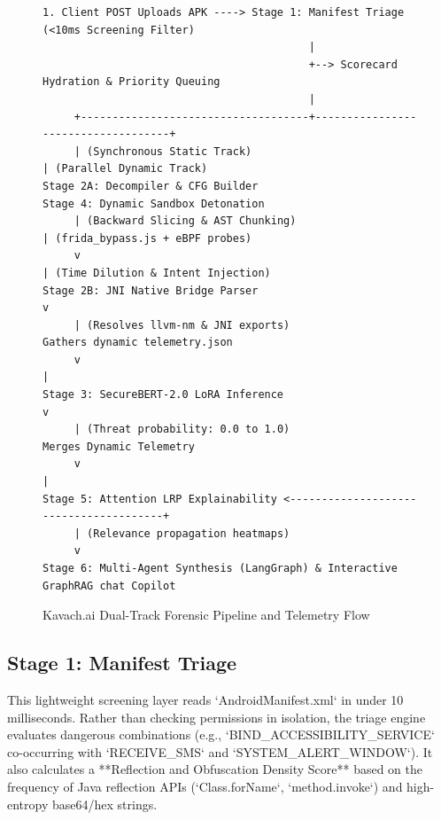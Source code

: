 \documentclass[conference]{IEEEtran}
\begin{document}
\begin{figure}[t]
\centering
\begin{minipage}{0.9\linewidth}
\begin{verbatim}
1. Client POST Uploads APK ----> Stage 1: Manifest Triage (<10ms Screening Filter)
                                          |
                                          +--> Scorecard Hydration & Priority Queuing
                                          |
     +------------------------------------+------------------------------------+
     | (Synchronous Static Track)                                              | (Parallel Dynamic Track)
Stage 2A: Decompiler & CFG Builder                                       Stage 4: Dynamic Sandbox Detonation
     | (Backward Slicing & AST Chunking)                                      | (frida_bypass.js + eBPF probes)
     v                                                                        | (Time Dilution & Intent Injection)
Stage 2B: JNI Native Bridge Parser                                            v
     | (Resolves llvm-nm & JNI exports)                                  Gathers dynamic telemetry.json
     v                                                                        |
Stage 3: SecureBERT-2.0 LoRA Inference                                       v
     | (Threat probability: 0.0 to 1.0)                                  Merges Dynamic Telemetry
     v                                                                        |
Stage 5: Attention LRP Explainability <---------------------------------------+
     | (Relevance propagation heatmaps)
     v
Stage 6: Multi-Agent Synthesis (LangGraph) & Interactive GraphRAG chat Copilot
\end{verbatim}
\end{minipage}
\caption{Kavach.ai Dual-Track Forensic Pipeline and Telemetry Flow}
\label{fig:sequence}
\end{figure}

\subsection{Stage 1: Manifest Triage}
This lightweight screening layer reads `AndroidManifest.xml` in under 10 milliseconds. Rather than checking permissions in isolation, the triage engine evaluates dangerous combinations (e.g., `BIND_ACCESSIBILITY_SERVICE` co-occurring with `RECEIVE_SMS` and `SYSTEM_ALERT_WINDOW`). It also calculates a **Reflection and Obfuscation Density Score** based on the frequency of Java reflection APIs (`Class.forName`, `method.invoke`) and high-entropy base64/hex strings. 
\end{document}
